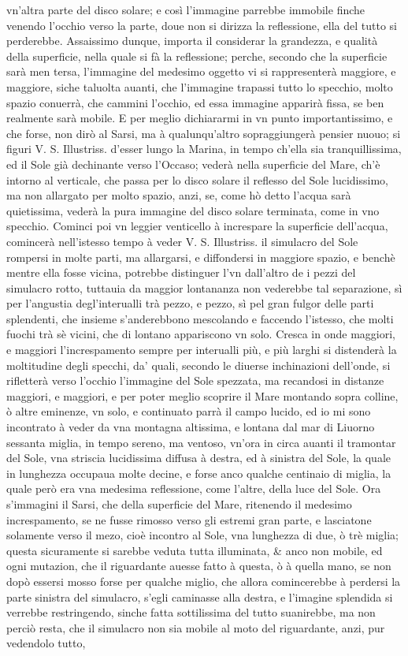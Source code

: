 \documentclass[11pt,twoside,openany]{book}
\begin{document}
vn'altra parte del disco solare; e così l'immagine parrebbe immobile finche venendo l'occhio verso la parte, doue non si dirizza la reflessione, ella del tutto si perderebbe. Assaissimo dunque, importa il considerar la grandezza, e qualità della superficie, nella quale si fà la reflessione; perche, secondo che la superficie sarà men tersa, l'immagine del medesimo oggetto vi si rappresenterà maggiore, e maggiore, siche taluolta auanti, che l'immagine trapassi tutto lo specchio, molto spazio conuerrà, che cammini l'occhio, ed essa immagine apparirà fissa, se ben realmente sarà mobile. E per meglio dichiararmi in vn punto importantissimo, e che forse, non dirò al Sarsi, ma à qualunqu'altro sopraggiungerà pensier nuouo; si figuri V. S. Illustriss. d'esser lungo la Marina, in tempo ch'ella sia tranquillissima, ed il Sole già dechinante verso l'Occaso; vederà nella superficie del Mare, ch'è intorno al verticale, che passa per lo disco solare il reflesso del Sole lucidissimo, ma non allargato per molto spazio, anzi, se, come hò detto l'acqua sarà quietissima, vederà la pura immagine del disco solare terminata, come in vno specchio. Cominci poi vn leggier venticello à increspare la superficie dell'acqua, comincerà nell'istesso tempo à veder V. S. Illustriss. il simulacro del Sole rompersi in molte parti, ma allargarsi, e diffondersi in maggiore spazio, e benchè mentre ella fosse vicina, potrebbe distinguer l'vn dall'altro de i pezzi del simulacro rotto, tuttauia da maggior lontananza non vederebbe tal separazione, sì per l'angustia degl'interualli trà pezzo, e pezzo, sì pel gran fulgor delle parti splendenti, che insieme s'anderebbono mescolando e faccendo l'istesso, che molti fuochi trà sè vicini, che di lontano appariscono vn solo. Cresca in onde maggiori, e maggiori l'increspamento sempre per interualli più, e più larghi si distenderà la moltitudine degli specchi, da' quali, secondo le diuerse inchinazioni dell'onde, si rifletterà verso l'occhio l'immagine del Sole spezzata, ma recandosi in distanze maggiori, e maggiori, e per poter meglio scoprire il Mare montando sopra colline, ò altre eminenze, vn solo, e continuato parrà il campo lucido, ed io mi sono incontrato à veder da vna montagna altissima, e lontana dal mar di Liuorno sessanta miglia, in tempo sereno, ma ventoso, vn'ora in circa auanti il tramontar del Sole, vna striscia lucidissima diffusa à destra, ed à sinistra del Sole, la quale in lunghezza occupaua molte decine, e forse anco qualche centinaio di miglia, la quale però era vna medesima reflessione, come l'altre, della luce del Sole. Ora s'immagini il Sarsi, che della superficie del Mare, ritenendo il medesimo increspamento, se ne fusse rimosso verso gli estremi gran parte, e lasciatone solamente verso il mezo, cioè incontro al Sole, vna lunghezza di due, ò trè miglia; questa sicuramente si sarebbe veduta tutta illuminata, \& anco non mobile, ed ogni mutazion, che il riguardante auesse fatto à questa, ò à quella mano, se non dopò essersi mosso forse per qualche miglio, che allora comincerebbe à perdersi la parte sinistra del simulacro, s'egli caminasse alla destra, e l'imagine splendida si verrebbe restringendo, sinche fatta sottilissima del tutto suanirebbe, ma non perciò resta, che il simulacro non sia mobile al moto del riguardante, anzi, pur vedendolo tutto, 
\end{document}
